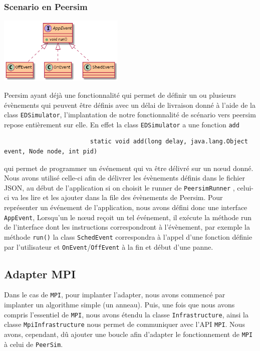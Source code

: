 \documentclass{article}
\begin{document}
						\subsubsection{Scenario en Peersim}
						\vspace{5mm}
						\hspace*{5cm} \includegraphics[width=60mm]{uml/scenPuml.png}
						
						\vspace{5mm}
						Peersim ayant déjà une fonctionnalité qui permet de définir un ou plusieurs évènements qui peuvent être définis avec un délai de livraison donné à l'aide de la class \verb|EDSimulator|,
						l'implantation de notre fonctionnalité de scénario vers peersim repose entièrement sur elle.
						En effet la class \verb|EDSimulator| a une fonction \verb|add|
						\begin{lstlisting}
						static void add(long delay, java.lang.Object event, Node node, int pid)
						\end{lstlisting}
						qui permet de programmer un événement qui va être délivré sur un nœud donné. 
						\newline
						Nous avons utilisé celle-ci afin de délivrer les évènements définis dans le fichier JSON, au début de l'application si on choisit le runner de \verb|PeersimRunner| , celui-ci va 
						les lire et les ajouter dans la file des évènements de Peersim.
		Pour représenter un événement de l'application, nous avons défini donc une interface \verb|AppEvent|,
						Lorsqu'un le nœud reçoit un tel événement, il exécute la méthode run de l'interface dont les instructions correspondront à l'évènement, par exemple la méthode \verb|run()| la class \verb|SchedEvent| 
						correspondra à l'appel d'une fonction définie par l'utilisateur et  \verb|OnEvent|/\verb|OffEvent| à la fin et début d'une panne.
			
			\newpage
			\subsection{Adapter MPI}
			Dans le cas de \verb|MPI|, pour implanter l'adapter, nous avons commencé par implanter un algorithme simple (un anneau). Puis, une fois que nous avons compris l'essentiel de \verb|MPI|, nous avons étendu la classe \verb|Infrastructure|, ainsi la classe \verb|MpiInfrastructure| nous permet de communiquer avec l'API \verb|MPI|. 
			Nous avons, cependant, dû ajouter une boucle afin d'adapter le fonctionnement de \verb|MPI| à celui de \verb|PeerSim|.
\end{document}
